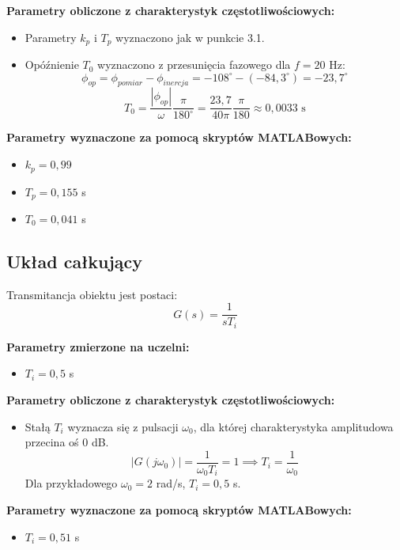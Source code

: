 \documentclass[12pt,a4paper]{article}
\begin{document}
	\noindent \textbf{Parametry obliczone z charakterystyk częstotliwościowych:}
	\begin{itemize}
		\item Parametry $k_p$ i $T_p$ wyznaczono jak w punkcie 3.1.
		\item Opóźnienie $T_0$ wyznaczono z przesunięcia fazowego dla $f = 20$ Hz:
		$$\phi_{op} = \phi_{pomiar} - \phi_{inercja} = -108^{\circ} - (-84{,}3^{\circ}) = -23{,}7^{\circ}$$
		$$T_0 = \frac{|\phi_{op}|}{ \omega } \frac{\pi}{180^{\circ}} = \frac{23{,}7}{40\pi} \frac{\pi}{180} \approx 0{,}0033 \text{ s}$$
	\end{itemize}
	
	\noindent \textbf{Parametry wyznaczone za pomocą skryptów MATLABowych:}
	\begin{itemize}
		\item $k_p = 0{,}99$ %
		\item $T_p = 0{,}155$ s %
		\item $T_0 = 0{,}041$ s %
	\end{itemize}
	
	\subsection{Układ całkujący}
	Transmitancja obiektu jest postaci:
	\begin{equation}
		G(s) = \frac{1}{sT_i}
	\end{equation}
	
	\noindent \textbf{Parametry zmierzone na uczelni:}
	\begin{itemize}
		\item $T_i = 0{,}5$ s %
	\end{itemize}
	
	\noindent \textbf{Parametry obliczone z charakterystyk częstotliwościowych:}
	\begin{itemize}
		\item Stałą $T_i$ wyznacza się z pulsacji $\omega_0$, dla której charakterystyka amplitudowa przecina oś 0 dB.
		$$|G(j\omega_0)| = \frac{1}{\omega_0 T_i} = 1 \implies T_i = \frac{1}{\omega_0}$$
		Dla przykładowego $\omega_0 = 2$ rad/s, $T_i=0,5$ s.
	\end{itemize}
	
	\noindent \textbf{Parametry wyznaczone za pomocą skryptów MATLABowych:}
	\begin{itemize}
		\item $T_i = 0{,}51$ s %
	\end{itemize}
	
\end{document}
